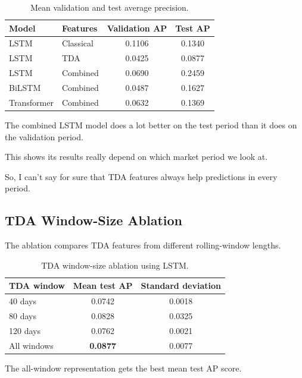 \documentclass[oneside,english,11pt]{article}
\begin{document}
\begin{table}[htbp]
\centering

\caption{Mean validation and test average precision.}
\label{tab:validation}

\begin{tabular}{llcc}
\toprule
Model & Features & Validation AP & Test AP\\
\midrule
LSTM & Classical & 0.1106 & 0.1340\\
LSTM & TDA & 0.0425 & 0.0877\\
LSTM & Combined & 0.0690 & 0.2459\\
BiLSTM & Combined & 0.0487 & 0.1627\\
Transformer & Combined & 0.0632 & 0.1369\\
\bottomrule
\end{tabular}

\end{table}

The combined LSTM model does a lot better
on the test period than it does on the
validation period.

This shows its results really depend
on which market period we look at.

So, I can’t say for sure that
TDA features always help
predictions in every period.

\subsection{TDA Window-Size Ablation}

The ablation compares TDA features
from different rolling-window lengths.

\begin{table}[htbp]
\centering

\caption{TDA window-size ablation using LSTM.}
\label{tab:ablation_results}

\begin{tabular}{lcc}
\toprule
TDA window & Mean test AP & Standard deviation\\
\midrule
40 days & 0.0742 & 0.0018\\
80 days & 0.0828 & 0.0325\\
120 days & 0.0762 & 0.0021\\
All windows & \textbf{0.0877} & 0.0077\\
\bottomrule
\end{tabular}

\end{table}

The all-window representation gets the best mean test AP score.
\end{document}
